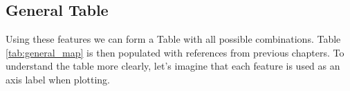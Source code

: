 

\subsection{General Table}
Using these features we can form a Table with all possible combinations.
Table \ref{tab:general_map} is then populated with references from previous chapters.
To understand the table more clearly, let's imagine that each feature is used as an axis label when plotting. 

